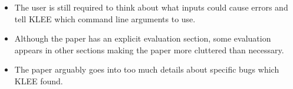 \documentclass[11pt]{article}
\begin{document}
\begin{itemize}

    \item The user is still required to think about what inputs could cause
    errors and tell KLEE which command line arguments to use.

    \item Although the paper has an explicit evaluation section, some
    evaluation appears in other sections making the paper more cluttered than
    necessary.

    \item The paper arguably goes into too much details about specific bugs which
    KLEE found.












\end{itemize}
\end{document}
